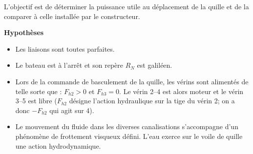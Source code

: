 \documentclass[10pt,fleqn]{article} %
\begin{document}
\begin{multicols}{2}


\fi
\begin{obj}
L’objectif est de déterminer la puissance utile au déplacement de la quille et de la comparer à celle installée
par le constructeur.
\end{obj}

\ifprof
\else
%



\textbf{Hypothèses}

\begin{itemize}
\item Les liaisons sont toutes parfaites.
\item Le bateau est à l’arrêt et son repère $R_N$ est galiléen.
\item Lors de la commande de basculement de la quille, les vérins sont alimentés de telle sorte que : $F_{h2} > 0$ et
$F_{h3} = 0$. Le vérin 2--4 est alors moteur et le vérin 3--5 est libre ($F_{h2}$ désigne l'action hydraulique sur la tige du vérin 2; on a donc $-F_{h2}$ qui agit sur 4).
\item Le mouvement du fluide dans les diverses canalisations s’accompagne d’un phénomène de frottement visqueux défini. L’eau exerce sur le voile de quille une action hydrodynamique.
\end{itemize}


\end{multicols}
\end{document}
